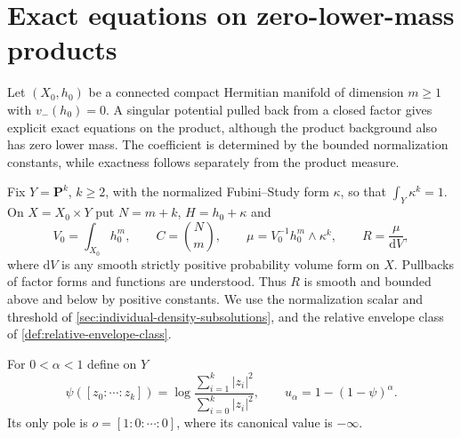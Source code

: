 \section{Exact equations on zero-lower-mass products}
\label{sec:zero-lower-mass-product-equations}

Let $(X_0,h_0)$ be a connected compact Hermitian manifold of dimension $m\geq1$ with $v_-(h_0)=0$. A singular potential pulled back from a closed factor gives explicit exact equations on the product, although the product background also has zero lower mass. The coefficient is determined by the bounded normalization constants, while exactness follows separately from the product measure.

Fix $Y=\mathbf P^k$, $k\geq2$, with the normalized Fubini--Study form $\kappa$, so that $\int_Y\kappa^k=1$. On $X=X_0\times Y$ put $N=m+k$, $H=h_0+\kappa$ and
\[
 V_0=\int_{X_0}h_0^m,\qquad C=\binom Nm,\qquad
 \mu=V_0^{-1}h_0^m\wedge\kappa^k,\qquad R=\frac{\mu}{\mathrm{d}V},
\]
where $\mathrm{d}V$ is any smooth strictly positive probability volume form on $X$. Pullbacks of factor forms and functions are understood. Thus $R$ is smooth and bounded above and below by positive constants. We use the normalization scalar and threshold of \cref{sec:individual-density-subsolutions}, and the relative envelope class of \cref{def:relative-envelope-class}.

For $0<\alpha<1$ define on $Y$
\[
 \psi([z_0:\cdots:z_k])=\log\frac{\sum_{i=1}^k|z_i|^2}{\sum_{i=0}^k|z_i|^2},
 \qquad u_\alpha=1-(1-\psi)^\alpha.
\]
Its only pole is $o=[1:0:\cdots:0]$, where its canonical value is $-\infty$.

